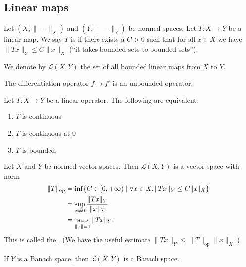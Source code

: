 \subsection{Linear maps}

\begin{definition}
Let $(X,\|-\|_{X})$ and $(Y,\|-\|_{Y})$ be normed spaces. Let $T\colon X\to Y$
be a linear map. We say $T$ is  if there exists a
$C>0$ such that for all $x\in X$ we have $\|Tx\|_{Y}\leq C\|x\|_{X}$
(``it takes bounded sets to bounded sets'').
\end{definition}

\begin{notation}
We denote by $\mathcal{L}(X,Y)$ the set of all bounded linear maps
from $X$ to $Y$.
\end{notation}

\begin{example}
The differentiation operator $f\mapsto f'$ is an unbounded operator.
\end{example}

\begin{theorem}
Let $T\colon X\to Y$ be a linear operator. The following are equivalent:
\begin{enumerate}
\item $T$ is continuous
\item $T$ is continuous at 0
\item $T$ is bounded.
\end{enumerate}
\end{theorem}

\begin{theorem}
Let $X$ and $Y$ be normed vector spaces. Then $\mathcal{L}(X,Y)$ is a
vector space with norm
\begin{subequations}
  \begin{align}
\|T\|_{\text{op}} &= \inf\{C\in[0,+\infty)\mid\forall x\in X\ldotp\|Tx\|_{Y}\leq C\|x\|_{X}\}\\
&= \sup_{x\neq0}\frac{\|Tx\|_{Y}}{\|x\|_{X}}\\
&= \sup_{\|x\|=1}\|Tx\|_{Y}.
  \end{align}
\end{subequations}
This is called the . (We have the useful
estimate $\|Tx\|_{Y}\leq\|T\|_{\text{op}}\|x\|_{X}$.)
\end{theorem}

\begin{theorem}
If $Y$ is a Banach space, then $\mathcal{L}(X,Y)$ is a Banach space.
\end{theorem}


